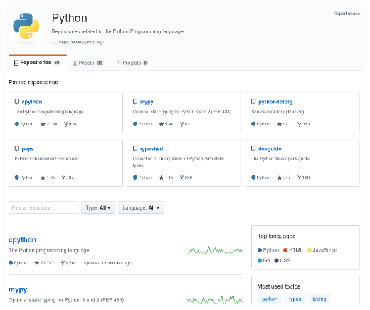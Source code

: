 \documentclass[spanish]{beamer}
\begin{document}
\begin{frame}
	\center
	\includegraphics[width=1\linewidth]{repo.png}
\end{frame}
\end{document}
